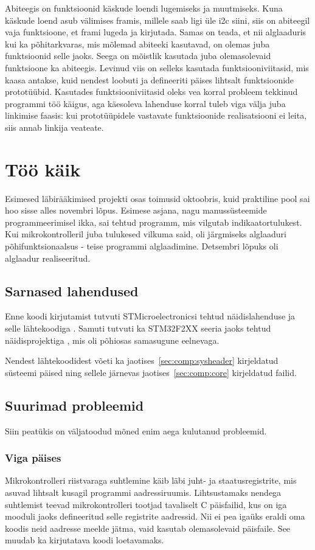 \documentclass[12pt,a4paper]{article}
\begin{document}
Abiteegis on funktsioonid käskude loendi lugemiseks ja muutmiseks. Kuna käskude
loend asub välimises \gls{fram}is, millele saab ligi üle \gls{i2c} siini, siis
on abiteegil vaja funktsioone, et \gls{fram}i lugeda ja kirjutada. Samas on
teada, et nii alglaaduris kui ka põhitarkvaras, mis mõlemad abiteeki kasutavad,
on olemas juba funktsioonid selle jaoks. Seega on mõistlik kasutada juba
olemasolevaid funktsioone ka abiteegis. Levinud viis on selleks kasutada
funktsiooniviitasid, mis kaasa antakse, kuid nendest loobuti ja defineeriti
päises lihtsalt funktsioonide prototüübid. Kasutades funktsiooniviitasid oleks
vea korral probleem tekkinud programmi töö käigus, aga käesoleva lahenduse
korral tuleb viga välja juba linkimise faasis: kui prototüüpidele vastavate
funktsioonide realisatsiooni ei leita, siis annab linkija veateate.

\section{Töö käik}
Esimesed läbirääkimised projekti osas toimusid oktoobris, kuid praktiline pool
sai hoo sisse alles novembri lõpus. Esimese asjana, nagu manussüsteemide
programmeerimisel ikka, sai tehtud programm, mis vilgutab indikaatortulukest.
Kui mikrokontrolleril juba tulukesed vilkuma said, oli järgmiseks alglaaduri
põhifunktsionaalsus - teise programmi alglaadimine. Detsembri lõpuks oli
alglaadur realiseeritud.

\subsection{Sarnased lahendused}
Enne koodi kirjutamist tutvuti STMicroelectronicsi tehtud näidislahenduse ja
selle lähtekoodiga \cite{f1IAP}. Samuti tutvuti ka STM32F2XX seeria jaoks tehtud
näidisprojektiga \cite{f2IAP}, mis oli põhiosas samasugune eelnevaga.

Nendest lähtekoodidest võeti ka jaotises~\ref{sec:comp:sysheader} kirjeldatud
süsteemi päised ning sellele järnevas jaotises~\ref{sec:comp:core}
kirjeldatud failid.

\subsection{Suurimad probleemid}
Siin peatükis on väljatoodud mõned enim aega kulutanud probleemid.
\subsubsection{Viga päises}
Mikrokontrolleri riistvaraga suhtlemine käib läbi juht- ja staatusregistrite,
mis asuvad lihtsalt kusagil programmi aadressiruumis. Lihtsustamaks nendega
suhtlemist teevad mikrokontrolleri tootjad tavaliselt C päisfailid, kus on iga
mooduli jaoks defineeritud selle registrite aadressid. Nii ei pea igaüks eraldi
oma koodis neid aadresse meelde jätma, vaid kasutab olemasolevaid päisfaile. See
muudab ka kirjutatava koodi loetavamaks.
\end{document}
